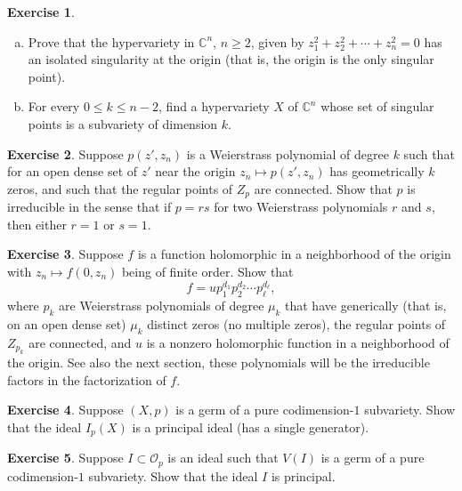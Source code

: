 \documentclass[12pt,openany]{book}
\newcommand{\C}{{\mathbb{C}}}
\newcommand{\sO}{{\mathscr{O}}}
\theoremstyle{plain}
\theoremstyle{remark}
\theoremstyle{definition}
\newenvironment{exbox}{%
    \def\FrameCommand{\vrule width 1pt \relax\hspace{10pt}}%
    \MakeFramed{\advance\hsize-\width\FrameRestore}%
}{%
    \endMakeFramed
}
\newenvironment{exparts}{%
    \leavevmode\begin{enumerate}[a),noitemsep,topsep=0pt,parsep=0pt,partopsep=0pt]
}{%
    \end{enumerate}
}
\theoremstyle{exercise}
\newtheorem{exercise}{Exercise}[section]
\theoremstyle{example}
\begin{document}
\begin{exbox}
\begin{exercise}
\begin{exparts}
\item
Prove that the hypervariety in $\C^n$, $n \geq 2$, given by $z_1^2 + z_2^2 + \cdots + z_n^2 = 0$
has an isolated singularity at the origin (that is, the origin is the only
singular point).
\item
For every $0 \leq k \leq n-2$, find a hypervariety $X$ of $\C^n$ whose set
of singular points is a subvariety of dimension $k$.
\end{exparts}
\end{exercise}

\begin{exercise}
Suppose $p(z',z_n)$ is a Weierstrass polynomial of degree $k$ such that
for an open dense set of $z'$ near the origin
$z_n \mapsto p(z',z_n)$ has geometrically $k$ zeros, and such that the
regular points of $Z_p$ are connected.  Show that $p$ is
irreducible in the sense that if $p = rs$ for two Weierstrass polynomials
$r$ and $s$, then either $r=1$ or $s=1$.
\end{exercise}

\begin{samepage}
\begin{exercise}
Suppose $f$ is a function holomorphic in a neighborhood of the origin with
$z_n \mapsto f(0,z_n)$ being of finite order.  Show that
\begin{equation*}
f = u p_1^{d_1} p_2^{d_2} \cdots p_\ell^{d_\ell} ,
\end{equation*}
where $p_k$ are Weierstrass polynomials of degree $\mu_k$ that have
generically (that is, on an open dense set) $\mu_k$ distinct zeros
(no multiple zeros), the regular points of $Z_{p_k}$ are
connected, and $u$ is a nonzero holomorphic function
in a neighborhood of the origin.  See also the next section, these
polynomials will be the irreducible factors in the factorization of $f$.
\end{exercise}
\end{samepage}

\begin{exercise}
Suppose $(X,p)$ is a germ of a pure codimension-$1$ subvariety.  Show that
the ideal $I_p(X)$ is a principal ideal (has a single generator).
\end{exercise}

\begin{exercise}
Suppose $I \subset \sO_p$ is an ideal such that $V(I)$ is a germ of a pure
codimension-$1$ subvariety.  Show that
the ideal $I$ is principal.
\end{exercise}


\end{exbox}
\end{document}
